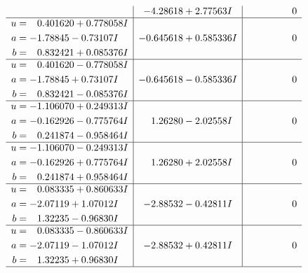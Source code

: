 \documentclass[1p]{elsarticle_modified}
\theoremstyle{definition}
\begin{document}
$$\begin{array}{c|c|c}
 & -4.28618 + 2.77563 I & \phantom{-0.000000 } 0 \\ \hline\begin{aligned}
u &= \phantom{-}0.401620 + 0.778058 I \\
a &= -1.78845 - 0.73107 I \\
b &= \phantom{-}0.832421 + 0.085376 I\end{aligned}
 & -0.645618 + 0.585336 I & \phantom{-0.000000 } 0 \\ \hline\begin{aligned}
u &= \phantom{-}0.401620 - 0.778058 I \\
a &= -1.78845 + 0.73107 I \\
b &= \phantom{-}0.832421 - 0.085376 I\end{aligned}
 & -0.645618 - 0.585336 I & \phantom{-0.000000 } 0 \\ \hline\begin{aligned}
u &= -1.106070 + 0.249313 I \\
a &= -0.162926 - 0.775764 I \\
b &= \phantom{-}0.241874 - 0.958464 I\end{aligned}
 & \phantom{-}1.26280 - 2.02558 I & \phantom{-0.000000 } 0 \\ \hline\begin{aligned}
u &= -1.106070 - 0.249313 I \\
a &= -0.162926 + 0.775764 I \\
b &= \phantom{-}0.241874 + 0.958464 I\end{aligned}
 & \phantom{-}1.26280 + 2.02558 I & \phantom{-0.000000 } 0 \\ \hline\begin{aligned}
u &= \phantom{-}0.083335 + 0.860633 I \\
a &= -2.07119 + 1.07012 I \\
b &= \phantom{-}1.32235 - 0.96830 I\end{aligned}
 & -2.88532 - 0.42811 I & \phantom{-0.000000 } 0 \\ \hline\begin{aligned}
u &= \phantom{-}0.083335 - 0.860633 I \\
a &= -2.07119 - 1.07012 I \\
b &= \phantom{-}1.32235 + 0.96830 I\end{aligned}
 & -2.88532 + 0.42811 I & \phantom{-0.000000 } 0\\
 \hline 
 \end{array}$$\newpage$$\begin{array}{c|c|c}  

\end{array}$$
\end{document}
